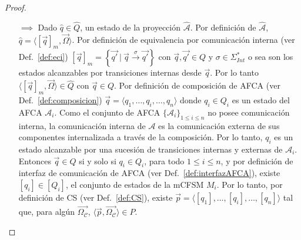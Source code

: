 \begin{proof} 
\begin{itemize}
    \item[$\implies$] Dado $\widehat{q} \in \widehat{Q}$, un estado de la proyección $\widehat{\mathcal{A}}$. Por definición de $\widehat{\mathcal{A}}$, $\widehat{q}= \langle [\overrightarrow{q}]_m, \overrightarrow{\Omega} \rangle$. Por definición de equivalencia por comunicación interna (ver Def.~\ref{def:eci}) $[\overrightarrow{q}]_m = \left\{\overrightarrow{q'}\ |\ \overrightarrow{q} \xrightarrow{\sigma}\overrightarrow{q'}\right\}$ con $\overrightarrow{q},\overrightarrow{q'} \in Q$ y $\sigma \in \Sigma_\mathit{Int}^*$ o sea son los estados alcanzables por transiciones internas desde $\overrightarrow{q}$. Por lo tanto $\langle [\overrightarrow{q}]_m, \overrightarrow{\Omega} \rangle \in \widehat{Q}$ con $\overrightarrow{q} \in Q$. Por definición de composición de AFCA (ver Def.~\ref{def:composicion}) $\overrightarrow{q} = \langle q_1, \ldots, q_i, \ldots, q_n \rangle$ donde $q_i \in Q_i$ es un estado del AFCA $\mathcal{A}_i$. Como el conjunto de AFCA $\{\mathcal{A}_i\}_{1 \leq i \leq n}$ no posee comunicación interna, la comunicación interna de $\mathcal{A}$ es la comunicación externa de sus componentes internalizada a través de la composición. Por lo tanto, $q_i$ es un estado alcanzable por una sucesión de transiciones internas y externas de $\mathcal{A}_i$. Entonces $\overrightarrow{q} \in Q$ si y solo si $q_i \in Q_i$, para todo $1 \leq i \leq n$, y por definición de interfaz de comunicación de AFCA (ver Def.~\ref{def:interfazAFCA}), existe $[q_i] \in [Q_i]$, el conjunto de estados de la mCFSM $M_i$. Por lo tanto, por definición de CS (ver Def.~\ref{def:CS}), existe $\overrightarrow{p} = \langle [q_1], \ldots, [q_i], \ldots, [q_n] \rangle$ tal que, para algún $\overrightarrow{\Omega_\mathcal{C}}$, $\langle \overrightarrow{p}, \overrightarrow{\Omega_\mathcal{C}} \rangle \in P$.
    

\end{itemize}
\end{proof}
